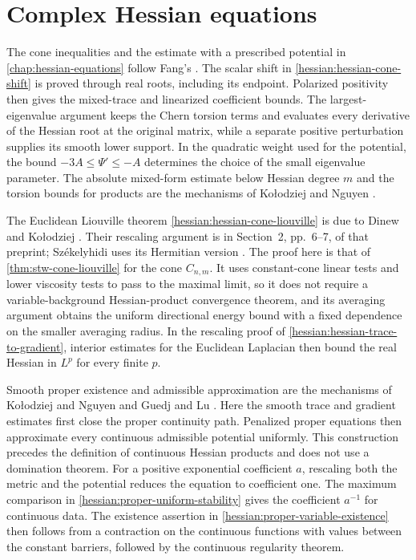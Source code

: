 \section{Complex Hessian equations}
\label{sec:history-hessian-equations}

The cone inequalities and the estimate with a prescribed potential in
\cref{chap:hessian-equations} follow Fang's
\cite[v1, Lemma~2.2, Proposition~2.3 and Theorem~3.1, pp.~5--6 and~8--17]{FangHessianSmooth26}.
The scalar shift in \cref{hessian:hessian-cone-shift} is proved through
real roots, including its endpoint. Polarized positivity then gives the
mixed-trace and linearized coefficient bounds. The largest-eigenvalue
argument keeps the Chern torsion terms and evaluates every derivative of
the Hessian root at the original matrix, while a separate positive
perturbation supplies its smooth lower support. In the quadratic weight
used for the potential, the bound $-3A\leq\Psi'\leq-A$ determines the
choice of the small eigenvalue parameter. The absolute mixed-form
estimate below Hessian degree $m$ and the torsion bounds for products are
the mechanisms of Ko{\l}odziej and Nguyen
\cite[arXiv~v2, Lemma~2.1, Lemma~2.3 and Corollary~2.4, pp.~3--6]{KNHessian16}.

The Euclidean Liouville theorem
\cref{hessian:hessian-cone-liouville} is due to Dinew and Ko{\l}odziej
\cite[arXiv~v2, Theorem~3.2, pp.~8--10]{DKHessian17}.
Their rescaling argument is in Section~2, pp.~6--7, of that preprint;
Sz{\'e}kelyhidi uses its Hermitian version
\cite[Section~6, pp.~366--368]{Sze18}.
The proof here is that of \cref{thm:stw-cone-liouville} for the cone
$C_{n,m}$. It uses constant-cone linear tests and lower viscosity tests
to pass to the maximal limit, so it does not require a variable-background
Hessian-product convergence theorem, and its averaging argument obtains the
uniform directional energy bound with a fixed dependence on the smaller
averaging radius. In the rescaling proof of
\cref{hessian:hessian-trace-to-gradient}, interior estimates for the
Euclidean Laplacian then bound the real Hessian in $L^p$ for every
finite $p$.

Smooth proper existence and admissible approximation are the mechanisms
of Ko{\l}odziej and Nguyen
\cite[arXiv~v2, Theorem~3.17 and Lemma~3.20, pp.~23--25]{KNHessian16}
and Guedj and Lu
\cite[arXiv~v1, Theorem~1.7, pp.~4--5]{GLHessian25}.
Here the smooth trace and gradient estimates first close the proper
continuity path. Penalized proper equations then approximate every
continuous admissible potential uniformly. This construction precedes the definition
of continuous Hessian products and does not use a domination theorem.
For a positive exponential coefficient $a$, rescaling both the metric and
the potential reduces the equation to coefficient one.
The maximum comparison in \cref{hessian:proper-uniform-stability}
gives the coefficient $a^{-1}$ for continuous data. The existence
assertion in \cref{hessian:proper-variable-existence} then follows
from a contraction on the continuous functions with values between
the constant barriers, followed by the continuous regularity theorem.

